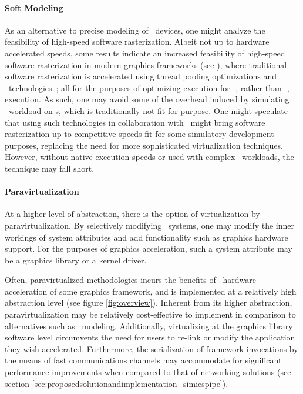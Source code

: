 \paragraph{Soft Modeling}
\label{par:backgroundandrelatedwork_graphicsvirtualization_softmodeling}
As an alternative to precise modeling of \dvttermgpu\ devices, one might analyze the feasibility of high-speed software rasterization.
Albeit not up to hardware accelerated speeds, some results indicate an increased feasibility of high-speed software rasterization in modern graphics frameworks (see ), where traditional software rasterization is accelerated using thread pooling optimizations and \dvttermsimd\ technologies~; all for the purposes of optimizing execution for \dvttermcpu -, rather than \dvttermgpu -, execution.
As such, one may avoid some of the overhead induced by simulating \dvttermgpu\ workload on \dvttermcpu s, which is traditionally not fit for purpose.
One might speculate that using such technologies in collaboration with \dvttermdirectvirtualization\ might bring software rasterization up to competitive speeds fit for some simulatory development purposes, replacing the need for more sophisticated virtualization techniques.
However, without native execution speeds or used with complex \dvttermgpu\ workloads, the technique may fall short.

\paragraph{Paravirtualization}
\label{par:backgroundandrelatedwork_graphicsvirtualization_paravirtualization}
At a higher level of abstraction, there is the option of virtualization by paravirtualization.
By selectively modifying \dvttermtarget\ systems, one may modify the inner workings of system attributes and add functionality such as graphics hardware support.
For the purposes of graphics acceleration, such a system attribute may be a graphics library or a kernel driver.

Often, paravirtualized methodologies incurs the benefits of \dvttermhost\ hardware acceleration of some graphics framework, and is implemented at a relatively high abstraction level (see figure \ref{fig:overview}).
Inherent from its higher abstraction, paravirtualization may be relatively cost-effective to implement in comparison to alternatives such as \dvttermgpu\ modeling.
Additionally, virtualizing at the graphics library software level circumvents the need for users to re-link or modify the application they wish accelerated.
Furthermore, the serialization of framework invocations by the means of fast communications channels may accommodate for significant performance improvements when compared to that of networking solutions (see section \ref{sec:proposedsolutionandimplementation_simicspipe}).

